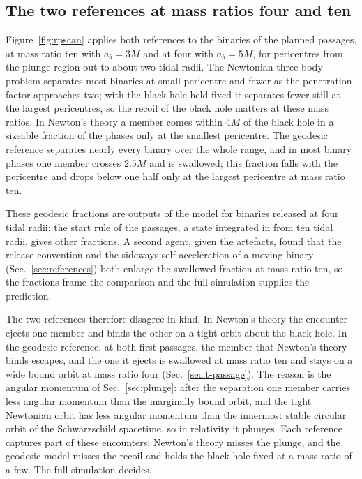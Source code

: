 \documentclass[aps,prd,twocolumn,10pt,superscriptaddress,nofootinbib,longbibliography,floatfix]{revtex4-2}
\begin{document}
\subsection{The two references at mass ratios four and ten}\label{sec:t-scan}

Figure~\ref{fig:rpscan} applies both references to the binaries of the planned passages, at mass ratio ten with $a_b=3M$ and at four with $a_b=5M$, for pericentres from the plunge region out to about two tidal radii. The Newtonian three-body problem separates most binaries at small pericentre and fewer as the penetration factor approaches two; with the black hole held fixed it separates fewer still at the largest pericentres, so the recoil of the black hole matters at these mass ratios. In Newton's theory a member comes within $4M$ of the black hole in a sizeable fraction of the phases only at the smallest pericentre. The geodesic reference separates nearly every binary over the whole range, and in most binary phases one member crosses $2.5M$ and is swallowed; this fraction falls with the pericentre and drops below one half only at the largest pericentre at mass ratio ten.

These geodesic fractions are outputs of the model for binaries released at four tidal radii; the start rule of the passages, a state integrated in from ten tidal radii, gives other fractions. A second agent, given the artefacts, found that the release convention and the sideways self-acceleration of a moving binary (Sec.~\ref{sec:references}) both enlarge the swallowed fraction at mass ratio ten, so the fractions frame the comparison and the full simulation supplies the prediction.

The two references therefore disagree in kind. In Newton's theory the encounter ejects one member and binds the other on a tight orbit about the black hole. In the geodesic reference, at both first passages, the member that Newton's theory binds escapes, and the one it ejects is swallowed at mass ratio ten and stays on a wide bound orbit at mass ratio four (Sec.~\ref{sec:t-passage}). The reason is the angular momentum of Sec.~\ref{sec:plunge}: after the separation one member carries less angular momentum than the marginally bound orbit, and the tight Newtonian orbit has less angular momentum than the innermost stable circular orbit of the Schwarzschild spacetime, so in relativity it plunges. Each reference captures part of these encounters: Newton's theory misses the plunge, and the geodesic model misses the recoil and holds the black hole fixed at a mass ratio of a few. The full simulation decides.
\end{document}
